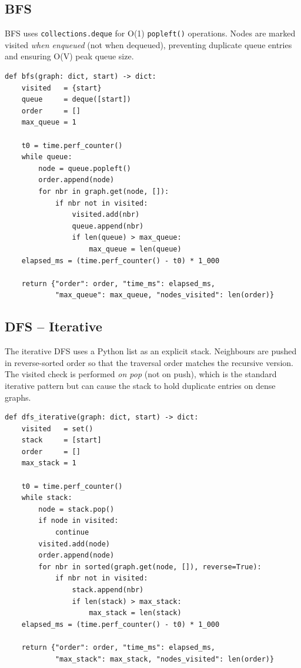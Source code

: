 \documentclass[12pt]{article}
\begin{document}
\subsection*{BFS}

\hspace{0.8cm} BFS uses \texttt{collections.deque} for O(1) \texttt{popleft()}
operations.  Nodes are marked visited \emph{when enqueued} (not when dequeued),
preventing duplicate queue entries and ensuring O(V) peak queue size.

\begin{lstlisting}[caption={Breadth-First Search}, label={lst:bfs}]
def bfs(graph: dict, start) -> dict:
    visited   = {start}
    queue     = deque([start])
    order     = []
    max_queue = 1

    t0 = time.perf_counter()
    while queue:
        node = queue.popleft()
        order.append(node)
        for nbr in graph.get(node, []):
            if nbr not in visited:
                visited.add(nbr)
                queue.append(nbr)
                if len(queue) > max_queue:
                    max_queue = len(queue)
    elapsed_ms = (time.perf_counter() - t0) * 1_000

    return {"order": order, "time_ms": elapsed_ms,
            "max_queue": max_queue, "nodes_visited": len(order)}
\end{lstlisting}

\subsection*{DFS -- Iterative}

\hspace{0.8cm} The iterative DFS uses a Python list as an explicit stack.  Neighbours
are pushed in reverse-sorted order so that the traversal order matches the recursive
version.  The visited check is performed \emph{on pop} (not on push), which is the
standard iterative pattern but can cause the stack to hold duplicate entries on dense
graphs.

\begin{lstlisting}[caption={DFS -- Iterative (explicit stack)}, label={lst:dfs-iter}]
def dfs_iterative(graph: dict, start) -> dict:
    visited   = set()
    stack     = [start]
    order     = []
    max_stack = 1

    t0 = time.perf_counter()
    while stack:
        node = stack.pop()
        if node in visited:
            continue
        visited.add(node)
        order.append(node)
        for nbr in sorted(graph.get(node, []), reverse=True):
            if nbr not in visited:
                stack.append(nbr)
                if len(stack) > max_stack:
                    max_stack = len(stack)
    elapsed_ms = (time.perf_counter() - t0) * 1_000

    return {"order": order, "time_ms": elapsed_ms,
            "max_stack": max_stack, "nodes_visited": len(order)}
\end{lstlisting}
\end{document}
